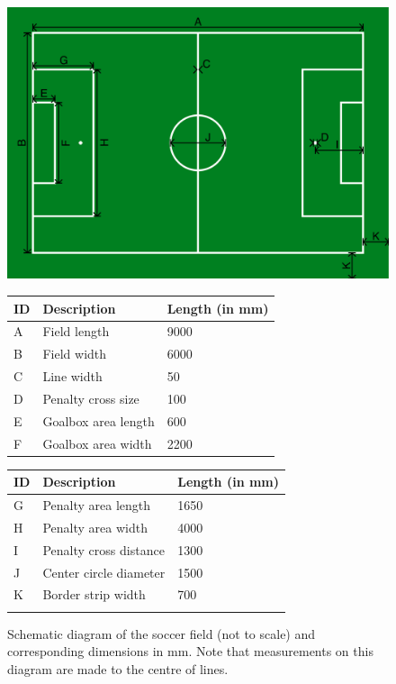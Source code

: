 \begin{figure}[b!]
	\centering
	\centerline{\includegraphics[width=\columnwidth]{figs/fieldDimensions2020.pdf}}
	\vspace{1ex}
	\begin{tabular}{| l | l | l |}
		ID & Description & Length (in mm) \\
		\hline \hline
		A & Field length & 9000 \\
		\hline
		B & Field width & 6000 \\
		\hline
		C & Line width & 50 \\
		\hline
		D & Penalty cross size & 100 \\
		\hline
		E & Goalbox area length & 600 \\
		\hline
		F & Goalbox area width & 2200 \\
	\end{tabular}
	\begin{tabular}{|l|l|l|}
		ID & Description & Length (in mm) \\
		\hline \hline
		G & Penalty area length & 1650 \\
		\hline
		H & Penalty area width & 4000 \\
		\hline
		I & Penalty cross distance & 1300 \\
		\hline
		J & Center circle diameter & 1500 \\
		\hline
		K & Border strip width & 700 \\
		\hline
		&  &  \\
	\end{tabular}
	\caption{Schematic diagram of the soccer field (not to scale) and corresponding dimensions in mm. Note that measurements on this diagram are made to the centre of lines.} \label{fig:field_dim}
\end{figure}


